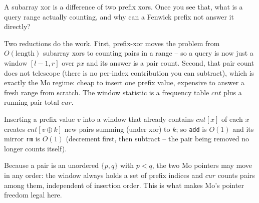 \begin{attemptgate}
A subarray xor is a difference of two prefix xors.  Once you see that, what is a
query range actually counting, and why can a Fenwick prefix not answer it directly?
\end{attemptgate}

Two reductions do the work.  First, prefix-xor moves the problem from
\(O(\text{length})\) subarray xors to counting pairs in a range -- so a query is now
just a window \([l-1,r]\) over \(px\) and its answer is a pair count.  Second, that
pair count does not telescope (there is no per-index contribution you can subtract),
which is exactly the Mo regime: cheap to insert one prefix value, expensive to answer
a fresh range from scratch.  The window statistic is a frequency table \(\mathit{cnt}\)
plus a running pair total \(cur\).

\begin{observation}
Inserting a prefix value \(v\) into a window that already contains \(\mathit{cnt}[x]\)
of each \(x\) creates \(cnt[v\oplus k]\) new pairs summing (under xor) to \(k\); so
\texttt{add} is \(O(1)\) and its mirror \texttt{rm} is \(O(1)\) (decrement first, then
subtract -- the pair being removed no longer counts itself).
\end{observation}
\begin{observation}
Because a pair is an unordered \(\{p,q\}\) with \(p<q\), the two Mo pointers may move
in any order: the window always holds a set of prefix indices and \(cur\) counts
pairs among them, independent of insertion order.  This is what makes Mo's pointer
freedom legal here.
\end{observation}

